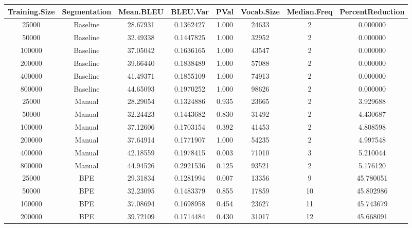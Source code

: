 \documentclass[11pt]{article}
\begin{document}
\begin{sidewaystable}
\centering
\begin{tabular}{|c|c|c|c|c|c|c|c|}
\hline
Training.Size & Segmentation & Mean.BLEU & BLEU.Var  & PVal  & Vocab.Size & Median.Freq & PercentReduction \\ \hline
25000         & Baseline     & 28.67931  & 0.1362427 & 1.000 & 24633       & 2           & 0.000000         \\
50000         & Baseline     & 32.49338  & 0.1447825 & 1.000 & 32952       & 2           & 0.000000         \\
100000        & Baseline     & 37.05042  & 0.1636165 & 1.000 & 43547       & 2           & 0.000000         \\
200000        & Baseline     & 39.66440  & 0.1838489 & 1.000 & 57088       & 2           & 0.000000         \\
400000        & Baseline     & 41.49371  & 0.1855109 & 1.000 & 74913       & 2           & 0.000000         \\
800000        & Baseline     & 44.65093  & 0.1970252 & 1.000 & 98626       & 2           & 0.000000         \\
25000         & Manual       & 28.29054  & 0.1324886 & 0.935 & 23665       & 2           & 3.929688         \\
50000         & Manual       & 32.24423  & 0.1443682 & 0.830 & 31492       & 2           & 4.430687         \\
100000        & Manual       & 37.12606  & 0.1703154 & 0.392 & 41453       & 2           & 4.808598         \\
200000        & Manual       & 37.64914  & 0.1771907 & 1.000 & 54235       & 2           & 4.997548         \\
400000        & Manual       & 42.18559  & 0.1978415 & 0.003 & 71010       & 3           & 5.210044         \\
800000        & Manual       & 44.94526  & 0.2921536 & 0.125 & 93521       & 2           & 5.176120         \\
25000         & BPE          & 29.31834  & 0.1281994 & 0.007 & 13356       & 9           & 45.780051        \\
50000         & BPE          & 32.23095  & 0.1483379 & 0.855 & 17859       & 10          & 45.802986        \\
100000        & BPE          & 37.08694  & 0.1698958 & 0.454 & 23627       & 11          & 45.743679        \\
200000        & BPE          & 39.72109  & 0.1714484 & 0.430 & 31017       & 12          & 45.668091        \\

\end{tabular}
\end{sidewaystable}
\end{document}
